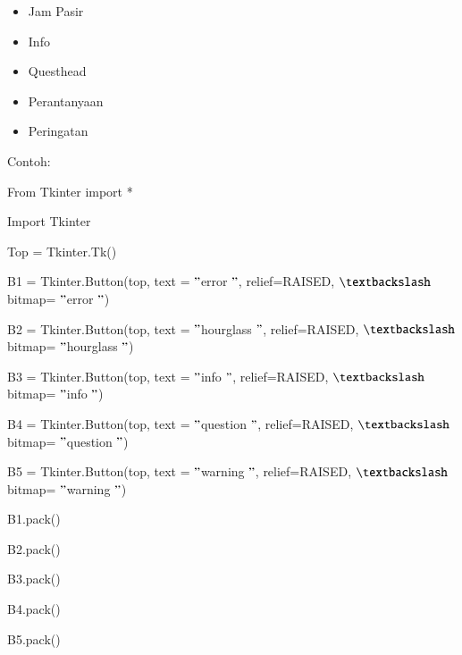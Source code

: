 \documentclass[a4paper,12pt]{report}
\begin{document}
\begin{myEnumerate}
\begin{itemize}
\noindent 
\item Jam Pasir \par
\noindent 
\item Info \par
\noindent 
\item Questhead \par
\noindent 
\item Perantanyaan  \par
\noindent 
\item Peringatan\end{itemize}
 \par
\vspace{12pt}
Contoh: \par
{\fontsize{10pt}{10pt}\selectfont From Tkinter import *} \par
{\fontsize{10pt}{10pt}\selectfont Import Tkinter} \par
\vspace{10pt}
{\fontsize{10pt}{10pt}\selectfont Top = Tkinter.Tk()} \par
\vspace{10pt}
{\fontsize{10pt}{10pt}\selectfont B1 = Tkinter.Button(top, text = $ " $error $ " $, relief=RAISED,  $  \textbackslash  $ bitmap= $ " $error $ " $)} \par
{\fontsize{10pt}{10pt}\selectfont B2 = Tkinter.Button(top, text = $ " $hourglass $ " $, relief=RAISED,  $  \textbackslash  $ bitmap= $ " $hourglass $ " $)} \par
{\fontsize{10pt}{10pt}\selectfont B3 = Tkinter.Button(top, text = $ " $info $ " $, relief=RAISED,  $  \textbackslash  $ bitmap= $ " $info $ " $)} \par
{\fontsize{10pt}{10pt}\selectfont B4 = Tkinter.Button(top, text = $ " $question $ " $, relief=RAISED,  $  \textbackslash  $ bitmap= $ " $question $ " $)} \par
{\fontsize{10pt}{10pt}\selectfont B5 = Tkinter.Button(top, text = $ " $warning $ " $, relief=RAISED,  $  \textbackslash  $ bitmap= $ " $warning $ " $)} \par
\vspace{10pt}
{\fontsize{10pt}{10pt}\selectfont B1.pack()} \par
{\fontsize{10pt}{10pt}\selectfont B2.pack()} \par
{\fontsize{10pt}{10pt}\selectfont B3.pack()} \par
{\fontsize{10pt}{10pt}\selectfont B4.pack()} \par
{\fontsize{10pt}{10pt}\selectfont B5.pack()} \par

\end{myEnumerate}
\end{document}
